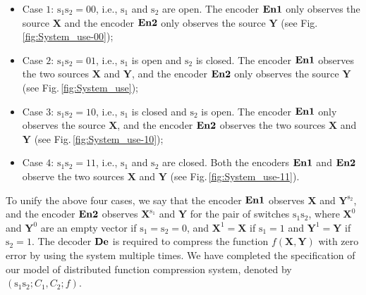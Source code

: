 \documentclass[11pt,draftclsnofoot,onecolumn]{IEEEtran}
\newcommand{\Enone}{\bf{En1}}
\newcommand{\Entwo}{\bf{En2}}
\newcommand{\De}{\bf{De}}
\begin{document}
 \begin{itemize}
\item Case $1$: $\boldsymbol{\mathrm{s}}_1\boldsymbol{\mathrm{s}}_2=00$, i.e., $\boldsymbol{\mathrm{s}}_1$ and $\boldsymbol{\mathrm{s}}_2$ are open. The encoder $\Enone$ only  observes the source $\boldsymbol{X}$  and the encoder $\Entwo$ only observes  the source $\boldsymbol{Y}$ (see Fig.\,\ref{fig:System_use-00});

\item Case $2$: $\boldsymbol{\mathrm{s}}_1\boldsymbol{\mathrm{s}}_2=01$, i.e.,
 $\boldsymbol{\mathrm{s}}_1$ is open and $\boldsymbol{\mathrm{s}}_2$ is closed.
 The encoder $\Enone$  observes the two sources $\boldsymbol{X}$ and $\boldsymbol{Y}$, and the encoder $\Entwo$ only observes the source  $\boldsymbol{Y}$ (see Fig.\,\ref{fig:System_use});

\item Case $3$: $\boldsymbol{\mathrm{s}}_1\boldsymbol{\mathrm{s}}_2=10$, i.e., $\boldsymbol{\mathrm{s}}_1$ is closed and $\boldsymbol{\mathrm{s}}_2$ is open.  The encoder $\Enone$ only  observes the source $\boldsymbol{X}$, and the encoder $\Entwo$ observes the two sources $\boldsymbol{X}$ and $\boldsymbol{Y}$ (see Fig.\,\ref{fig:System_use-10});

\item Case $4$: $\boldsymbol{\mathrm{s}}_1\boldsymbol{\mathrm{s}}_2=11$, i.e., $\boldsymbol{\mathrm{s}}_1$ and $\boldsymbol{\mathrm{s}}_2$ are closed. Both the encoders $\Enone$ and  $\Entwo$ observe the two sources $\boldsymbol{X}$ and $\boldsymbol{Y}$ (see Fig.\,\ref{fig:System_use-11}).
\end{itemize}
To unify the above four cases, we say that the encoder $\Enone$ observes $\boldsymbol{X}$ and $\boldsymbol{Y}^{\boldsymbol{\mathrm{s}}_2}$, and the encoder  $\Entwo$ observes $\boldsymbol{X}^{\boldsymbol{\mathrm{s}}_1}$ and $\boldsymbol{Y}$ for the pair of switches $\boldsymbol{\mathrm{s}}_1\boldsymbol{\mathrm{s}}_2$, where $\boldsymbol{X}^{0}$ and $\boldsymbol{Y}^{0}$ are an empty vector if $\boldsymbol{\mathrm{s}}_1=\boldsymbol{\mathrm{s}}_2=0$, and $\boldsymbol{X}^{1}=\boldsymbol{X}$ if $\boldsymbol{\mathrm{s}}_1=1$ and $\boldsymbol{Y}^{1}=\boldsymbol{Y}$ if $\boldsymbol{\mathrm{s}}_2=1$.
The decoder $\De$ is required to compress the function $f(\boldsymbol{X},\boldsymbol{Y})$ with zero error by using the system multiple times.
 We have completed the specification of our model of distributed function compression  system,  denoted by $(\boldsymbol{\mathrm{s}}_1\boldsymbol{\mathrm{s}}_2;C_{1}, C_{2};  f)$.
\end{document}
